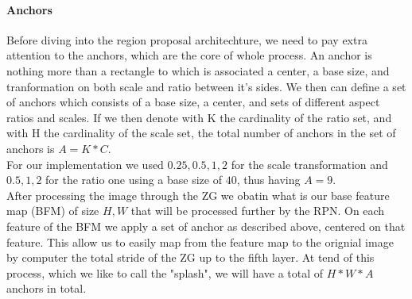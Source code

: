 \documentclass[10pt,journal,cspaper,compsoc]{IEEEtran}
\begin{document}
   \paragraph{Anchors}
    Before diving into the region proposal architechture, we need to pay extra attention to the anchors, which are the core of whole process. An anchor is nothing more than a rectangle to which is associated a center, a base size, and tranformation on both scale and ratio between it's sides. We then can define a set of anchors which consists of a base size, a center, and sets of different 
   aspect ratios and scales. If we then denote with K the cardinality of the ratio set, and with H the cardinality of the scale set, the total number of anchors in the set of anchors is $A = K * C$. \\
   For our implementation we used ${0.25, 0.5, 1, 2}$ for the scale transformation and ${0.5, 1, 2}$ for the ratio one using a base size of $40$, thus having $A = 9$. \\ 
   After processing the image through the ZG we obatin what is our base feature map (BFM) of size $H, W$  that will be processed further by the RPN. On each feature of the BFM  we apply a set of anchor as described above, centered on that feature. This allow us to easily map from the feature map to the orignial image by computer the total stride of the ZG up to the fifth layer.
   At tend of this process, which we like to call the "splash",  we will have a total of $H*W*A$ anchors in total.
\end{document}
